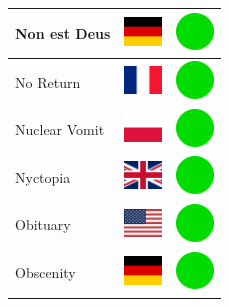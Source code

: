 \documentclass[12pt, a4paper, twoside]{report}
\begin{document}
\begin{center}
\begin{longtable}{|p{5cm}|p{2cm}|p{2cm}|}
 Non est Deus                                               & \includegraphics[width=1cm]{../4x3/de} &   \includegraphics[width=1cm]{../likes/y} \\ \hline
 No Return                                                  & \includegraphics[width=1cm]{../4x3/fr} &   \includegraphics[width=1cm]{../likes/y} \\ \hline
 Nuclear Vomit                                              & \includegraphics[width=1cm]{../4x3/pl} &   \includegraphics[width=1cm]{../likes/y} \\ \hline
 Nyctopia                                                   & \includegraphics[width=1cm]{../4x3/gb} &   \includegraphics[width=1cm]{../likes/y} \\ \hline
 Obituary                                                   & \includegraphics[width=1cm]{../4x3/us} &   \includegraphics[width=1cm]{../likes/y} \\ \hline
 Obscenity                                                  & \includegraphics[width=1cm]{../4x3/de} &   \includegraphics[width=1cm]{../likes/y} \\ \hline

\end{longtable}
\end{center}
\end{document}
